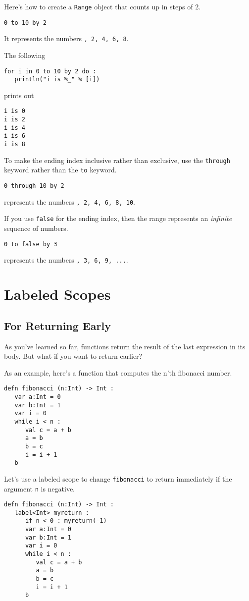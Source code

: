 \documentclass[10pt,oneside]{book}
\begin{document}
Here's how to create a \texttt{\frenchspacing Range} object that counts up in steps of 2.
\begin{lstlisting}
0 to 10 by 2
\end{lstlisting}
It represents the numbers \texttt{, 2, 4, 6, 8}.

The following
\begin{lstlisting}
for i in 0 to 10 by 2 do :
   println("i is %_" % [i])
\end{lstlisting}
prints out
\begin{lstlisting}
i is 0
i is 2
i is 4
i is 6
i is 8
\end{lstlisting}

To make the ending index inclusive rather than exclusive, use the \texttt{\frenchspacing through} keyword rather than the \texttt{\frenchspacing to} keyword.
\begin{lstlisting}
0 through 10 by 2
\end{lstlisting}
represents the numbers \texttt{, 2, 4, 6, 8, 10}.

If you use \texttt{\frenchspacing false} for the ending index, then the range represents an {\em infinite} sequence of numbers.
\begin{lstlisting}
0 to false by 3
\end{lstlisting}
represents the numbers \texttt{, 3, 6, 9, ...}. 

\section{Labeled Scopes}

\subsection*{For Returning Early}
As you've learned so far, functions return the result of the last expression in its body. But what if you want to return earlier? 

As an example, here's a function that computes the n'th fibonacci number. 
\begin{lstlisting}
defn fibonacci (n:Int) -> Int :
   var a:Int = 0
   var b:Int = 1
   var i = 0
   while i < n :
      val c = a + b
      a = b
      b = c
      i = i + 1
   b
\end{lstlisting}

Let's use a labeled scope to change \texttt{\frenchspacing fibonacci} to return \texttt{} immediately if the argument \texttt{\frenchspacing n} is negative. 
\begin{lstlisting}
defn fibonacci (n:Int) -> Int :
   label<Int> myreturn :
      if n < 0 : myreturn(-1)
      var a:Int = 0
      var b:Int = 1
      var i = 0
      while i < n :
         val c = a + b
         a = b
         b = c
         i = i + 1
      b
\end{lstlisting}
\end{document}

